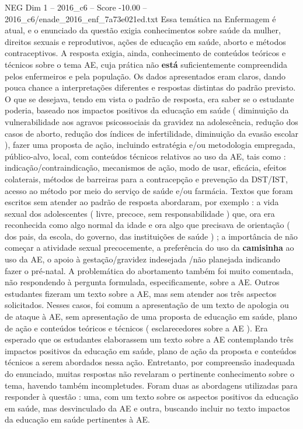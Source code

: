 \begin{textsample}{NEG Dim 1 – 2016\_c6 – Score -10.00 – 2016\_c6/enade\_2016\_enf\_7a73e021ed.txt}
Essa temática na Enfermagem é atual, e o enunciado da questão exigia conhecimentos sobre saúde da mulher, direitos sexuais e reprodutivos, ações de educação em saúde, aborto e métodos contraceptivos.
A resposta exigia, ainda, conhecimento de conteúdos teóricos e técnicos sobre o tema AE, cuja prática não \textbf{está} suficientemente compreendida pelos enfermeiros e pela população.
Os dados apresentados eram claros, dando pouca chance a interpretações diferentes e respostas distintas do padrão previsto.
O que se desejava, tendo em vista o padrão de resposta, era saber se o estudante poderia, baseado nos impactos positivos da educação em saúde ( diminuição da vulnerabilidade aos agravos psicossociais da gravidez na adolescência, redução dos casos de aborto, redução dos índices de infertilidade, diminuição da evasão escolar ), fazer uma proposta de ação, incluindo estratégia e/ou metodologia empregada, público-alvo, local, com conteúdos técnicos relativos ao uso da AE, tais como : indicação/contraindicação, mecanismos de ação, modo de usar, eficácia, efeitos colaterais, métodos de barreiras para a contracepção e prevenção da DST/IST, acesso ao método por meio do serviço de saúde e/ou farmácia.
Textos que foram escritos sem atender ao padrão de resposta abordaram, por exemplo : a vida sexual dos adolescentes ( livre, precoce, sem responsabilidade ) que, ora era reconhecida como algo normal da idade e ora algo que precisava de orientação ( dos pais, da escola, do governo, das instituições de saúde ) ; a importância de não começar a atividade sexual precocemente, a preferência do uso da \textbf{camisinha} ao uso da AE, o apoio à gestação/gravidez indesejada /não planejada indicando fazer o pré-natal.
A problemática do abortamento também foi muito comentada, não respondendo à pergunta formulada, especificamente, sobre a AE.
Outros estudantes fizeram um texto sobre a AE, mas sem atender aos três aspectos solicitados.
Nesses casos, foi comum a apresentação de um texto de apologia ou de ataque à AE, sem apresentação de uma proposta de educação em saúde, plano de ação e conteúdos teóricos e técnicos ( esclarecedores sobre a AE ).
Era esperado que os estudantes elaborassem um texto sobre a AE contemplando três impactos positivos da educação em saúde, plano de ação da proposta e conteúdos técnicos a serem abordados nessa ação.
Entretanto, por compreensão inadequada do enunciado, muitas respostas não revelaram o pertinente conhecimento sobre o tema, havendo também incompletudes.
Foram duas as abordagens utilizadas para responder à questão : uma, com um texto sobre os aspectos positivos da educação em saúde, mas desvinculado da AE e outra, buscando incluir no texto impactos da educação em saúde pertinentes à AE.

\end{textsample}
